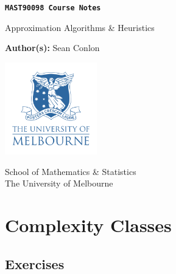 \documentclass[a4paper,10pt]{article}
\begin{document}
\begin{titlepage}
   \begin{center}
       \vspace*{1cm}

       \textbf{\texttt{MAST90098 Course Notes}}

       \vspace{0.5cm}
        Approximation Algorithms \& Heuristics
            
       \vspace{1.5cm}

        
       \textbf{Author(s):} Sean Conlon \\

       \vfill
        
     
       \includegraphics[width=0.3\textwidth]{images/uomlogo.png}
            
       School of Mathematics \& Statistics \\
       The University of Melbourne\\
            
   \end{center}
\end{titlepage}

\tableofcontents
\thispagestyle{empty}
\clearpage
\setcounter{page}{1}



\newpage
\section{Complexity Classes}

\newpage
\subsection{Exercises}
\end{document}
